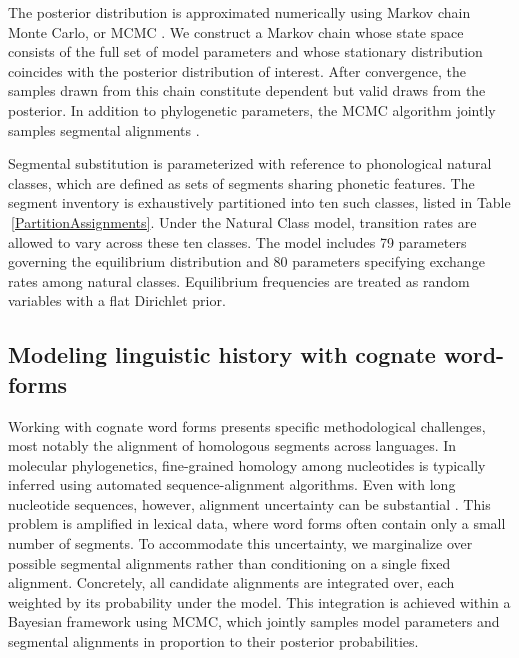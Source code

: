 \documentclass[numsec,webpdf,modern,large,namedate]{oup-authoring-template}
\begin{document}
The posterior distribution is approximated numerically using Markov chain Monte Carlo, or MCMC \citep{Metropolis1953,Hastings1970}. We construct a Markov chain whose state space consists of the full set of model parameters and whose stationary distribution coincides with the posterior distribution of interest. After convergence, the samples drawn from this chain constitute dependent but valid draws from the posterior. In addition to phylogenetic parameters, the MCMC algorithm jointly samples segmental alignments \citep{Lunter2005a}. 

Segmental substitution is parameterized with reference to phonological natural classes, which are defined as sets of segments sharing phonetic features. The segment inventory is exhaustively partitioned into ten such classes, listed in Table$~$\ref{PartitionAssignments}. Under the Natural Class model, transition rates are allowed to vary across these ten classes. The model includes 79 parameters governing the equilibrium distribution and 80 parameters specifying exchange rates among natural classes. Equilibrium frequencies are treated as random variables with a flat Dirichlet prior. 

\subsection{Modeling linguistic history with cognate word-forms}
\label{PaperSections_CognateWordForms}
Working with cognate word forms presents specific methodological challenges, most notably the alignment of homologous segments across languages. In molecular phylogenetics, fine-grained homology among nucleotides is typically inferred using automated sequence-alignment algorithms. Even with long nucleotide sequences, however, alignment uncertainty can be substantial \citep{Wong2008}. This problem is amplified in lexical data, where word forms often contain only a small number of segments. To accommodate this uncertainty, we marginalize over possible segmental alignments rather than conditioning on a single fixed alignment. Concretely, all candidate alignments are integrated over, each weighted by its probability under the model. This integration is achieved within a Bayesian framework using MCMC, which jointly samples model parameters and segmental alignments in proportion to their posterior probabilities.
\end{document}
